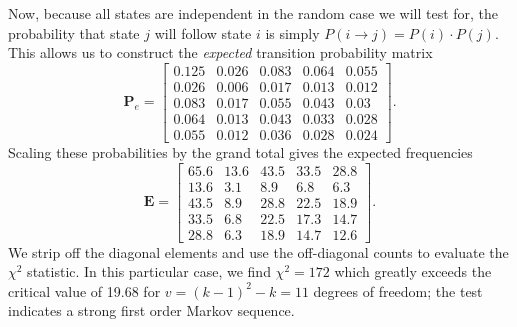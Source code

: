 \begin{example}
	Now, because all states are independent in the random case we will test for, the probability 
that state $j$ will follow state $i$ is simply $P(i \rightarrow j) = P(i) \cdot P(j)$.  This allows us to construct the 
\emph{expected} transition probability matrix
\begin{equation}
\mathbf{P}_e = \left [ \begin{array}{ccccc}
0.125 & 0.026 & 0.083 & 0.064 & 0.055 \\
0.026 & 0.006 & 0.017 & 0.013 & 0.012\\
0.083 & 0.017 & 0.055 & 0.043 & 0.03 \\
0.064 & 0.013 & 0.043 & 0.033 & 0.028 \\
0.055 & 0.012 & 0.036 & 0.028 & 0.024
\end{array} \right ].
\end{equation}
Scaling these probabilities by the grand total gives the expected frequencies
\begin{equation}
\mathbf{E} = \left [ \begin{array}{ccccc}
65.6  & 13.6 & 43.5 & 33.5  & 28.8  \\
13.6  & 3.1   & 8.9   & 6.8   & 6.3  \\
43.5  & 8.9   & 28.8 & 22.5  & 18.9 \\
33.5 & 6.8   & 22.5  &17.3   & 14.7  \\
28.8  & 6.3  & 18.9  & 14.7 &  12.6 
\end{array} \right ].
\end{equation}
We strip off the diagonal elements and use the off-diagonal counts to evaluate the $\chi^2$ statistic.  
In this particular case, we find $\chi^2 = 172$ which greatly exceeds the critical value of 19.68 for $v = (k-1)^2 - 
k = 11$ degrees of freedom; the test indicates a strong first order Markov sequence.
\end{example}

